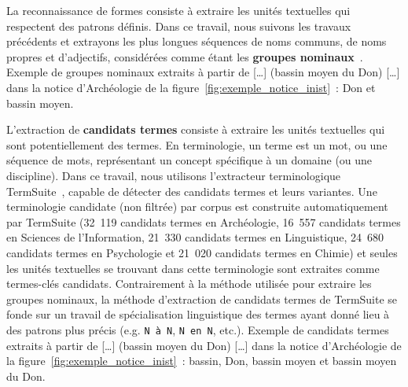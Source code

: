     La reconnaissance de formes consiste à extraire les unités textuelles qui
    respectent des patrons définis. Dans ce travail, nous suivons les travaux
    précédents et extrayons les plus longues séquences de noms communs, de noms
    propres et d'adjectifs, considérées comme étant les \textbf{groupes
    nominaux}~\cite{hassan2010conundrums}. Exemple de groupes nominaux extraits
    à partir de \og{}[\dots] (bassin moyen du Don) [\dots]\fg{} dans la notice
    d'Archéologie de la figure~\ref{fig:exemple_notice_inist}~: \og{}Don\fg{} et
    \og{}bassin moyen\fg{}.

    L'extraction de \textbf{candidats termes} consiste à extraire les unités
    textuelles qui sont potentiellement des termes. En terminologie, un terme
    est un mot, ou une séquence de mots, représentant un concept spécifique à un
    domaine (ou une discipline). Dans ce travail, nous utilisons l'extracteur
    terminologique TermSuite~\cite{rocheteau2011termsuite}, capable de détecter
    des candidats termes et leurs variantes. Une terminologie candidate (non
    filtrée) par corpus est construite automatiquement par TermSuite (32~119
    candidats termes en Archéologie, 16~557 candidats termes en Sciences de
    l'Information, 21~330 candidats termes en Linguistique, 24~680 candidats
    termes en Psychologie et 21~020 candidats termes en Chimie) et seules les
    unités textuelles se trouvant dans cette terminologie sont extraites comme
    termes-clés candidats. Contrairement à la méthode utilisée pour extraire les
    groupes nominaux, la méthode d'extraction de candidats termes de TermSuite
    se fonde sur un travail de spécialisation linguistique des termes ayant
    donné lieu à des patrons plus précis (e.g. \texttt{N à N}, \texttt{N en N},
    etc.). Exemple de candidats termes extraits à partir de \og{}[\dots] (bassin
    moyen du Don) [\dots]\fg{} dans la notice d'Archéologie de la
    figure~\ref{fig:exemple_notice_inist}~: \og{}bassin\fg{}, \og{}Don\fg{},
    \og{}bassin moyen\fg{} et \og{}bassin moyen du Don\fg{}.
    

